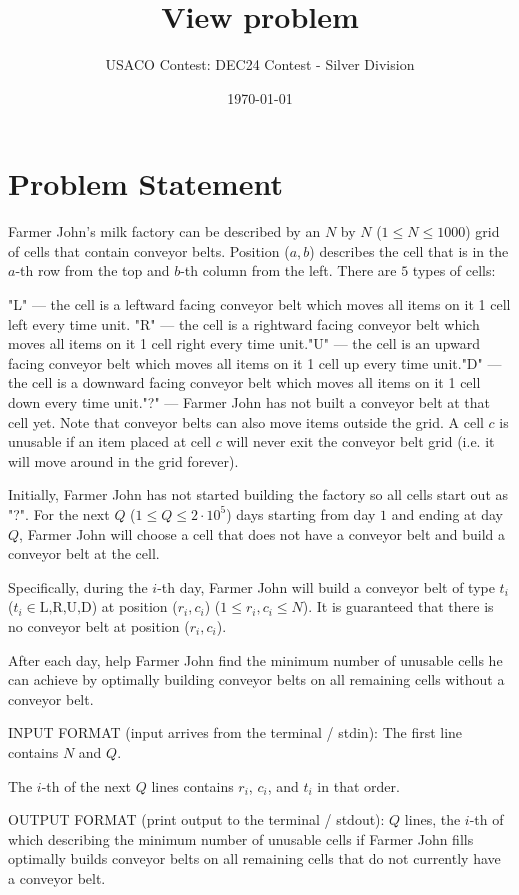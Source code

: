 \documentclass[12pt]{article}
\title{View problem}
\author{USACO Contest: DEC24 Contest - Silver Division}
\date{\today}
\begin{document}
\maketitle

\section*{Problem Statement}


Farmer John's milk factory can be described by an $N$ by $N$
($1 \le N \le 1000$) grid of cells that contain conveyor belts. Position ($a,b$)
describes the cell that is in the $a$-th row from the top and $b$-th column from
the left. There are $5$ types of cells:

"L" — the cell is a leftward facing conveyor belt which moves all items on
it 1 cell left every time unit. "R" — the cell is a rightward
facing conveyor belt which moves all items on it 1 cell right every time
unit."U" — the cell is an upward facing conveyor belt which moves
all items on it 1 cell  up every time unit."D" — the cell is a
downward facing conveyor belt which moves all items on it 1 cell down every time
unit."?" — Farmer John has not built a conveyor belt at that cell
yet.
Note that conveyor belts can also move items outside the grid.  A cell $c$ is
unusable if an item placed at cell $c$ will never exit the
conveyor belt grid (i.e. it will move around in the grid forever).

Initially, Farmer John has not started building the factory so all cells start
out as "?". For the next $Q$ ($1 \le Q \le 2 \cdot 10^5$) days starting from day
$1$ and ending at day $Q$, Farmer John will choose a cell that does not
have a conveyor belt and build a conveyor  belt at the cell. 

Specifically, during the $i$-th day, Farmer John will build a conveyor belt of
type $t_i$ ($t_i \in {\text{{L,R,U,D}}}$) at position ($r_i,c_i$)
($1 \le r_i,c_i \le N$).  It is guaranteed that there is no conveyor belt at
position ($r_i,c_i$).

After each day, help Farmer John find the minimum number of unusable cells he
can achieve by optimally building conveyor belts on all remaining
cells without a conveyor belt.

INPUT FORMAT (input arrives from the terminal / stdin):
The first line contains $N$ and $Q$.

The $i$-th of the next $Q$ lines contains $r_i$, $c_i$, and $t_i$ in that order.

OUTPUT FORMAT (print output to the terminal / stdout):
$Q$ lines, the $i$-th of which describing the minimum number of unusable cells
if Farmer John fills optimally builds conveyor belts on all remaining cells that
do not currently have a conveyor belt.
\end{document}

